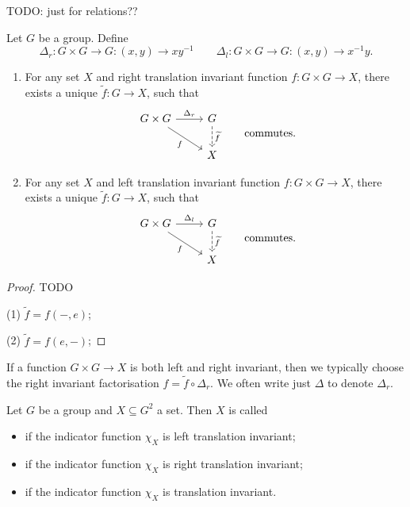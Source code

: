 TODO: just for relations??
\begin{proposition}
Let $G$ be a group. Define
\[ \Delta_r:G\times G\to G: (x,y) \to xy^{-1} \qquad \Delta_l:G\times G\to G: (x,y) \to x^{-1}y. \]
\begin{enumerate}
\item For any set $X$ and right translation invariant function $f:G\times G\to X$, there exists a unique $\widetilde{f}: G\to X$, such that
\[ \begin{tikzcd}
G\times G \rar{\Delta_r} \ar[dr, swap, "{f}"] & G \dar[dashed]{\widetilde{f}} \\
 & X
\end{tikzcd} \qquad\text{commutes.} \]
\item For any set $X$ and left translation invariant function $f:G\times G\to X$, there exists a unique $\widetilde{f}: G\to X$, such that
\[ \begin{tikzcd}
G\times G \rar{\Delta_l} \ar[dr, swap, "{f}"] & G \dar[dashed]{\widetilde{f}} \\
 & X
\end{tikzcd} \qquad\text{commutes.} \]
\end{enumerate}
\end{proposition}
\begin{proof}
TODO

(1) $\widetilde{f} = f(-, e)$;

(2) $\widetilde{f} = f(e, -)$;
\end{proof}

If a function $G\times G\to X$ is both left and right invariant, then we typically choose the right invariant factorisation $f = \widetilde{f}\circ \Delta_r$. We often write just $\Delta$ to denote $\Delta_r$.

\begin{definition}
Let $G$ be a group and $X\subseteq G^2$ a set. Then $X$ is called
\begin{itemize}
\item {} if the indicator function $\chi_X$ is left translation invariant;
\item {} if the indicator function $\chi_X$ is right translation invariant;
\item {} if the indicator function $\chi_X$ is translation invariant.
\end{itemize}
\end{definition}


